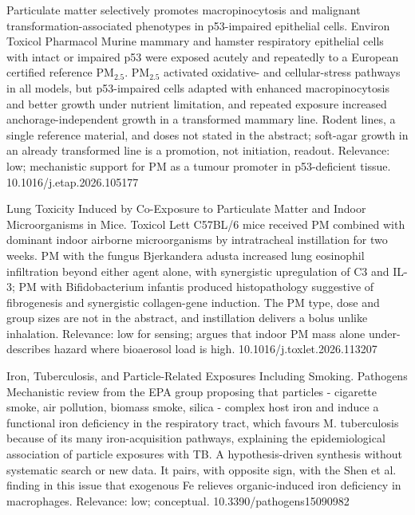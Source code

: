\documentclass[10pt]{article}
\begin{document}
{Particulate matter selectively promotes macropinocytosis and malignant transformation-associated phenotypes in p53-impaired epithelial cells.}
{Environ Toxicol Pharmacol}
{Murine mammary and hamster respiratory epithelial cells with intact or impaired p53 were exposed acutely and repeatedly to a European certified reference PM$_{2.5}$. PM$_{2.5}$ activated oxidative- and cellular-stress pathways in all models, but p53-impaired cells adapted with enhanced macropinocytosis and better growth under nutrient limitation, and repeated exposure increased anchorage-independent growth in a transformed mammary line. Rodent lines, a single reference material, and doses not stated in the abstract; soft-agar growth in an already transformed line is a promotion, not initiation, readout. Relevance: low; mechanistic support for PM as a tumour promoter in p53-deficient tissue.}
{10.1016/j.etap.2026.105177}

{Lung Toxicity Induced by Co-Exposure to Particulate Matter and Indoor Microorganisms in Mice.}
{Toxicol Lett}
{C57BL/6 mice received PM combined with dominant indoor airborne microorganisms by intratracheal instillation for two weeks. PM with the fungus Bjerkandera adusta increased lung eosinophil infiltration beyond either agent alone, with synergistic upregulation of C3 and IL-3; PM with Bifidobacterium infantis produced histopathology suggestive of fibrogenesis and synergistic collagen-gene induction. The PM type, dose and group sizes are not in the abstract, and instillation delivers a bolus unlike inhalation. Relevance: low for sensing; argues that indoor PM mass alone under-describes hazard where bioaerosol load is high.}
{10.1016/j.toxlet.2026.113207}

{Iron, Tuberculosis, and Particle-Related Exposures Including Smoking.}
{Pathogens}
{Mechanistic review from the EPA group proposing that particles - cigarette smoke, air pollution, biomass smoke, silica - complex host iron and induce a functional iron deficiency in the respiratory tract, which favours M. tuberculosis because of its many iron-acquisition pathways, explaining the epidemiological association of particle exposures with TB. A hypothesis-driven synthesis without systematic search or new data. It pairs, with opposite sign, with the Shen et al. finding in this issue that exogenous Fe relieves organic-induced iron deficiency in macrophages. Relevance: low; conceptual.}
{10.3390/pathogens15090982}
\end{document}
